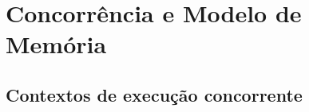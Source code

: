 
\section{Concorrência e Modelo de Memória}

\subsection{Contextos de execução concorrente}
\label{subsec:contexts}

